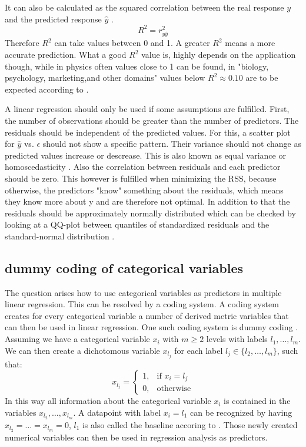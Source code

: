 \documentclass[12 pt]{scrartcl}
\begin{document}
It can also be calculated as the squared correlation between the real response $y$ and the predicted response $\hat{y}$ \citep[p.~113]{fahrmeir2013regression}.
\[ R^2 =  r_{y\hat{y}}^2\]
Therefore $R^2$ can take values between 0 and 1. A greater $R^2$ means a more accurate prediction. What a good $R^2$ value is, highly depends on the application though, while in physics often values close to 1 can be found, in "biology, psychology, marketing,and other domains" values below $R^2 \approx 0.10$ are to be expected according to \citet[p.~70]{james2013introduction}.

A linear regression should only be used if some assumptions are fulfilled. First, the number of observations should be greater than the number of predictors. The residuals should be independent of the predicted values. For this, a scatter plot for $\hat{y}$ vs. $\epsilon$ should not show a specific pattern. Their variance should not change as predicted values increase or descrease. This is also known as equal variance or homoscedasticity \citep{Prabhakaran}. Also the correlation between residuals and each predictor should be zero. This however is fulfilled when minimizing the RSS, because otherwise, the predictors "know" something about the residuals, which means they know more about y and are therefore not optimal. In addition to that the residuals should be approximately normally distributed which can be checked by looking at a QQ-plot between quantiles of standardized residuals and the standard-normal distribution \citep{Prabhakaran}.

\subsection{dummy coding of categorical variables}
The question arises how to use categorical variables as predictors in multiple linear regression. This can be resolved by a coding system. A coding system creates for every categorical variable a number of derived metric variables that can then be used in linear regression. One such coding system is dummy coding \citep[p.~85]{james2013introduction}.
Assuming we have a categorical variable $x_i$ with $m \ge 2$ levels with labels $l_1, \dots, l_m$. We can then create a dichotomous variable $x_{l_j}$ for each label $l_j \in\{l_2, \dots, l_m\}$, such that:
\[
  x_{l_j}=
  \begin{cases}
    1, & \text{if } x_i = l_j \\
    0, & \text{otherwise}
  \end{cases}
\]
In this way all information about the categorical variable $x_i$ is contained in the variables $x_{l_2}, \dots, x_{l_m}$. A datapoint with label $x_i = l_1$ can be recognized by having $x_{l_2} = \dots = x_{l_m} = 0$, $l_1$ is also called the baseline accoring to \citet[p.~86]{james2013introduction}. Those newly created numerical variables can then be used in regression analysis as predictors.
\end{document}
